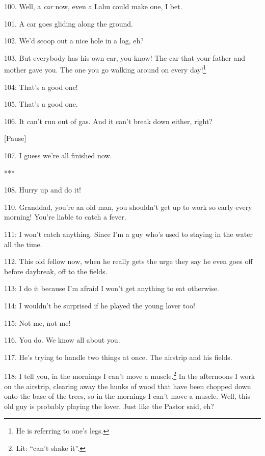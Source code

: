 100. Well, a \textit{car }now, even a Lahu could make one, I bet.

101. A car goes gliding along the ground.

102. We'd scoop out a nice hole in a log, eh?


103. But everybody has his own car, you know! The car that your father and mother
gave you. The one you go walking around on every day!\footnote{He is referring to one's legs.}

 104: That's a good one!

105. That's a good one.

106. It can't run out of gas. And it can't break down either, right?

\begin{center}
[Pause]
\end{center}

107. I guess we're all finished now.

\begin{center}
***
\end{center}

108. Hurry up and do it!

110. Granddad, you're an old man, you shouldn't get up to work so early every morning!
You're liable to catch a fever.

 111: I won't catch anything. Since I'm a guy who's
used to staying in the water all the time.

112. This old fellow now, when he really gets the urge they say he even goes off
before daybreak, off to the fields.

 113: I do it because I'm afraid I won't get anything
to eat otherwise.

 114: I wouldn't be surprised if he played the young lover
too!

 115: Not me, not me!

116. You do. We know all about you.

117. He's trying to handle two things at once. The airstrip and his fields.

 118: I tell you, in the mornings I can't
move a muscle.\footnote{Lit: ``can't shake it''.} In the afternoons I work on the airstrip, clearing away the
hunks of wood that have been chopped down onto the base of the trees, so in the
mornings I can't move a muscle. Well, this old guy is probably playing the lover.
Just like the Pastor said, eh?


